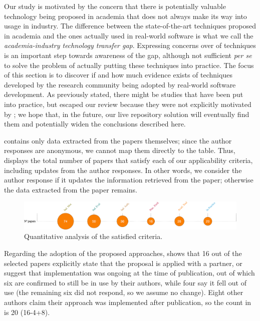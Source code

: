 Our study is motivated by the concern that there is potentially valuable technology being proposed in academia that does not always make its way into usage in industry.
The difference between the state-of-the-art techniques proposed in academia and the ones actually used in real-world software is what we call the \emph{academia-industry technology transfer gap}.
Expressing concerns over \rea of \rt techniques is an important step towards awareness of the gap, although not sufficient \textit{per se} to solve the problem of actually putting these techniques into practice.
The focus of this section is to discover if and how much evidence exists of techniques developed by the research community being adopted by real-world software development.
As previously stated, there might be studies that have been put into practice, but escaped our review because they were not explicitly motivated by \rea; we hope that, in the future, our live repository solution will eventually find them and potentially widen the conclusions described here.

 contains only data extracted from the papers themselves; since the author responses are anonymous, we cannot map them directly to the table.
Thus,~ displays the total number of papers that satisfy each of our applicability criteria, including updates from the author responses.
In other words, we consider the author response if it updates the information retrieved from the paper; otherwise the data extracted from the paper remains.

\begin{figure}
  \center
  \includegraphics[width=\linewidth]{figures/relevance_count.png}
  \caption{Quantitative analysis of the satisfied criteria.}
  \label{fig:relevance_count}
\end{figure}


Regarding the adoption of the proposed approaches,  shows that 16 out of the \numpapers selected papers explicitly state that the proposal is applied with a partner, or suggest that implementation was ongoing at the time of publication, out of which six are confirmed to still be in use by their authors, while four say it fell out of use (the remaining six did not respond, so we assume no change).
Eight other authors claim their approach was implemented after publication, so the count in~ is 20 (16-4+8).

